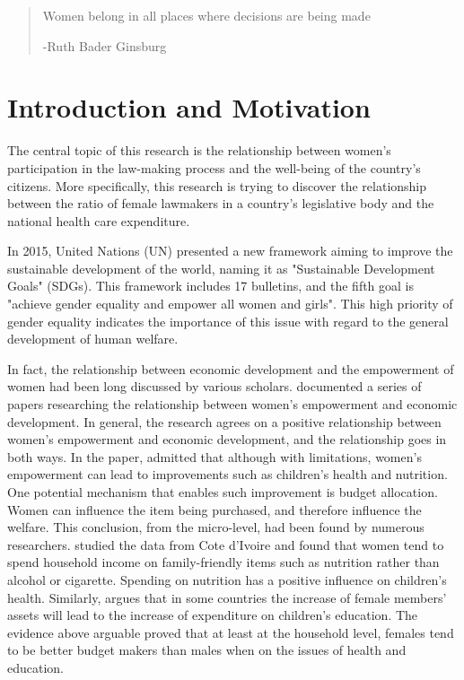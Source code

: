 \documentclass[12pt]{article}
\begin{document}

\tableofcontents
\thispagestyle{empty}
\newpage

\begin{quotation}
	Women belong in all places where decisions are being made
\begin{flushright}
-Ruth Bader Ginsburg
\end{flushright}
\end{quotation}

\section{Introduction and Motivation}
The central topic of this research is the relationship between women's participation in the law-making process and the well-being of the country's citizens.
More specifically, this research is trying to discover the relationship between the ratio of female lawmakers in a country's legislative body and the national health care expenditure.

In 2015, United Nations (UN) presented a new framework aiming to improve the sustainable development of the world, naming it as "Sustainable Development Goals" (SDGs).
This framework includes 17 bulletins, and the fifth goal is "achieve gender equality and empower all women and girls".
This high priority of gender equality indicates the importance of this issue with regard to the general development of human welfare.

In fact, the relationship between economic development and the empowerment of women had been long discussed by various scholars.
 documented a series of papers researching the relationship between women's empowerment and economic development.
In general, the research agrees on a positive relationship between women's empowerment and economic development, and the relationship goes in both ways.
In the paper, \citeauthor{Duflo2012} admitted that although with limitations, women's empowerment can lead to improvements such as children's health and nutrition.
One potential mechanism that enables such improvement is budget allocation.
Women can influence the item being purchased, and therefore influence the welfare.
This conclusion, from the micro-level, had been found by numerous researchers.
 studied the data from Cote d'Ivoire and found that women tend to spend household income on family-friendly items such as nutrition rather than alcohol or cigarette.
Spending on nutrition has a positive influence on children's health.
Similarly,  argues that in some countries the increase of female members' assets will lead to the increase of expenditure on children's education. 
The evidence above arguable proved that at least at the household level, females tend to be better budget makers than males when on the issues of health and education. 
\end{document}
